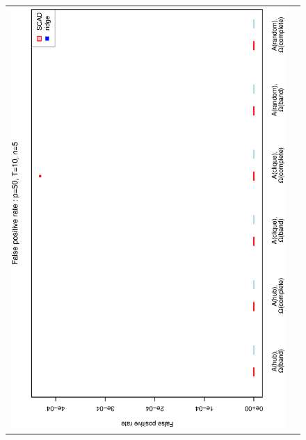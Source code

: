 \documentclass[a4paper]{article}
\begin{document}
\begin{figure}[h!]
\centering
\begin{tabular}{cc}
\includegraphics[scale=0.45,angle=270]{ROCfpr50T10N5_5.eps}
\\

\end{tabular}
\end{figure}
\end{document}
